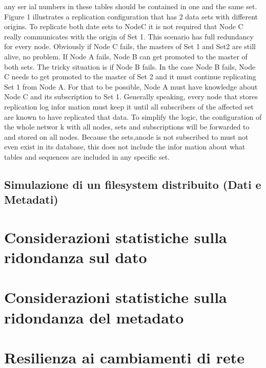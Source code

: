 any ser ial numbers in these tables should be contained in one and the same set.
Figure 1 illustrates a replication configuration that has 2 data sets with different
origins. To replicate both date sets to NodeC it is not required that Node C
really communicates with the origin of Set 1. This scenario has full redundancy
for every node. Obviously if Node C fails, the masters of Set 1 and Set2 are still
alive, no problem. If Node A fails, Node B can get promoted to the master of both
sets. The tricky situation is if Node B fails.
In the case Node B fails, Node C needs to get promoted to the master of
Set 2 and it must continue replicating Set 1 from Node A. For that to be possible,
Node A must have knowledge about Node C and its subscription to Set 1. Generally
speaking, every node that stores replication log infor mation must keep it until
all subscribers of the affected set are known to have replicated that data.
To simplify the logic, the configuration of the whole networ k with all nodes,
sets and subscriptions will be forwarded to and stored on all nodes. Because the
sets,anode is not subscribed to must not even exist in its database, this does
not include the infor mation about what tables and sequences are included in any
specific set.
\subsection{Simulazione di un filesystem distribuito (Dati e Metadati)}
\section{Considerazioni statistiche sulla ridondanza sul dato}
\section{Considerazioni statistiche sulla ridondanza del metadato}
\section{Resilienza ai cambiamenti di rete}